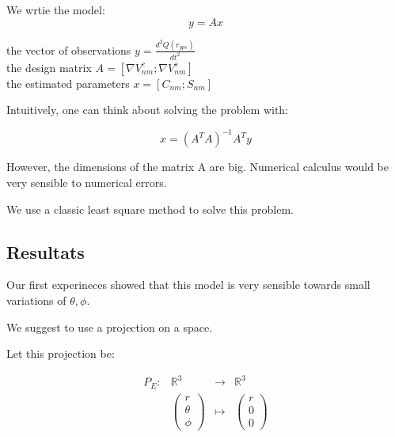 \documentclass{article}
\begin{document}
We wrtie the model:
\begin{equation}
    y = A x    
\end{equation}

the vector of observations $y = \frac{d^2 Q(r_{gps})}{dt^2}$\\

the design matrix $A = \left[ \nabla V_{nm}^c ; \nabla V_{nm}^s \right]  $\\

the estimated parameters $x= \left[C_{nm} ; S_{nm}\right]$ 

Intuitively, one can think about solving the problem with: 

\begin{equation*}
    x = (A^TA)^{-1} A^T y
\end{equation*}

However, the dimensions of the matrix A are big. Numerical calculus would be very sensible to numerical errors. 

We use a classic least square method to solve this problem. 
\subsection{Resultats}
Our first experineces showed that this model is very sensible towards small variations of $\theta ,  \phi$.

We suggest to use a projection on a space. 

Let this projection be: 

\begin{equation}
    \begin{array}{l|rcl}
        P_E : & \mathbb{R}^3 & \longrightarrow &\mathbb{R}^3   \\
            
        & \left(\begin{array}{ll}
                r \\
                \theta \\
                \phi
                \end{array}
            \right )   & \longmapsto & \left(
                \begin{array}{ll}
                r \\
                0 \\
                0
                \end{array}
            \right ) \end{array}
\end{equation}
\end{document}

